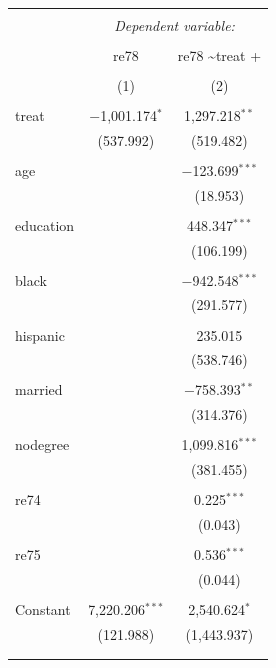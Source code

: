 \documentclass[nojss]{jss}
\begin{document}
\begin{table}[!h] \centering 
  \caption{} 
  \label{} 
\begin{tabular}{@{\extracolsep{5pt}}lcc} 
\\[-1.8ex]\hline 
\hline \\[-1.8ex] 
 & \multicolumn{2}{c}{\textit{Dependent variable:}} \\ 
\cline{2-3} 
\\[-1.8ex] & re78 & re78 \textasciitilde treat + \\ 
\\[-1.8ex] & (1) & (2)\\ 
\hline \\[-1.8ex] 
 treat & $-$1,001.174$^{*}$ & 1,297.218$^{**}$ \\ 
  & (537.992) & (519.482) \\ 
  & & \\ 
 age &  & $-$123.699$^{***}$ \\ 
  &  & (18.953) \\ 
  & & \\ 
 education &  & 448.347$^{***}$ \\ 
  &  & (106.199) \\ 
  & & \\ 
 black &  & $-$942.548$^{***}$ \\ 
  &  & (291.577) \\ 
  & & \\ 
 hispanic &  & 235.015 \\ 
  &  & (538.746) \\ 
  & & \\ 
 married &  & $-$758.393$^{**}$ \\ 
  &  & (314.376) \\ 
  & & \\ 
 nodegree &  & 1,099.816$^{***}$ \\ 
  &  & (381.455) \\ 
  & & \\ 
 re74 &  & 0.225$^{***}$ \\ 
  &  & (0.043) \\ 
  & & \\ 
 re75 &  & 0.536$^{***}$ \\ 
  &  & (0.044) \\ 
  & & \\ 
 Constant & 7,220.206$^{***}$ & 2,540.624$^{*}$ \\ 
  & (121.988) & (1,443.937) \\ 
  & & \\ 
\hline \\[-1.8ex] 

\end{tabular}
\end{table}
\end{document}
